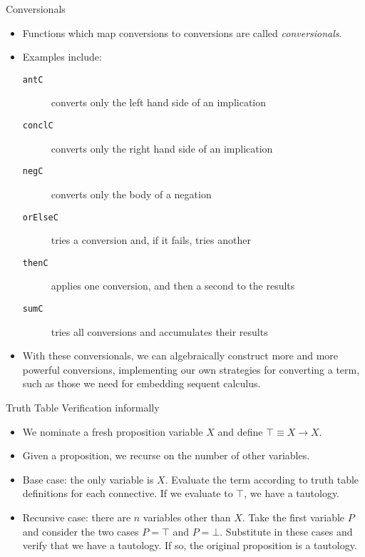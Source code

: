 \documentclass[presentation]{beamer}
\begin{document}
\begin{frame}[fragile,label={sec:orgheadline27}]{Conversionals}
 \begin{itemize}
\item Functions which map conversions to conversions are called \emph{conversionals}.
\item Examples include:
\begin{description}
\item[{\texttt{antC}}] converts only the left hand side of an implication
\item[{\texttt{conclC}}] converts only the right hand side of an implication
\item[{\texttt{negC}}] converts only the body of a negation
\item[{\texttt{orElseC}}] tries a conversion and, if it fails, tries another
\item[{\texttt{thenC}}] applies one conversion, and then a second to the results
\item[{\texttt{sumC}}] tries all conversions and accumulates their results
\end{description}

\item With these conversionals, we can algebraically construct more and more powerful
conversions, implementing our own strategies for converting a term, such as those
we need for embedding sequent calculus.
\end{itemize}
\end{frame}

\begin{frame}[label={sec:orgheadline28}]{Truth Table Verification informally}
\begin{itemize}
\item We nominate a fresh proposition variable \(X\) and define 
\(\top \equiv X \rightarrow X\).
\item Given a proposition, we recurse on the number of other variables.
\item Base case: the only variable is \(X\). Evaluate the term according to truth table
definitions for each connective. If we evaluate to \(\top\), we have a tautology.
\item Recursive case: there are \(n\) variables other than \(X\). Take the first variable
\(P\) and consider the two cases \(P = \top\) and \(P = \bot\). Substitute in these
cases and verify that we have a tautology. If so, the original proposition is a
tautology.
\end{itemize}
\end{frame}
\end{document}
